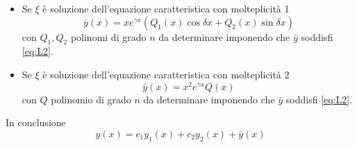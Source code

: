 \documentclass{article}
\begin{document}
\begin{enumerate}
\begin{itemize}
        \item Se $\xi$ è soluzione dell'equazione caratteristica con molteplicità 1
        \[\bar y(x)=xe^{\gamma x}\left( Q_1(x)\cos \delta x +Q_2(x)\sin \delta x\right)\]
        con $Q_1, Q_2$ polinomi di grado $n$ da determinare imponendo che $\bar y$ soddisfi \eqref{eq:L2}.
        \item Se $\xi$ è soluzione dell'equazione caratteristica con molteplicità 2
        \[\bar y(x)=x^2e^{\gamma x} Q(x)\]
        con $Q$ polinomio di grado $n$ da determinare imponendo che $\bar y$ soddisfi \eqref{eq:L2}.
    \end{itemize}
\end{enumerate}
In conclusione
\[y(x)=c_1y_1(x)+c_2y_2(x)+\bar y(x)\]
\end{document}
